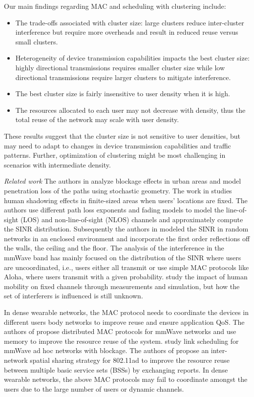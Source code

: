 \documentclass[10pt, conference, letterpaper]{IEEEtran}
\begin{document}
Our main findings regarding MAC and scheduling with clustering include:
\begin{itemize}
	\item The trade-offs associated with cluster size: large clusters reduce inter-cluster interference but require more overheads and result in reduced reuse versus small clusters.
	\item Heterogeneity of device transmission capabilities impacts the best cluster size: highly directional transmissions requires smaller cluster size while low directional transmissions require larger clusters to mitigate interference. 
	\item The best cluster size is fairly insensitive to user density when it is high. 
	\item The resources allocated to each user may not decrease with density, thus the total reuse of the network may scale with user density.
\end{itemize}

These results suggest that the cluster size is not sensitive to user densities, but may need to adapt to changes in device transmission capabilities and traffic patterns. 
Further, optimization of clustering might be most challenging in scenarios with intermediate density.

\emph{Related work}
The authors in \cite{urbanblockage} analyze blockage effects in urban areas and model penetration loss of the paths using stochastic geometry. 
The work in \cite{interferencefinitesized} studies human shadowing effects in finite-sized areas when users' locations are fixed. 
The authors use different path loss exponents and fading models to model the line-of-sight (LOS) and non-line-of-sight (NLOS) channels and approximately compute the SINR distribution. 
Subsequently the authors in \cite{enclosedmmwave} modeled the SINR in random networks in an enclosed environment and incorporate the first order reflections off the walls, the ceiling and the floor. 
The analysis of the interference in the mmWave band has mainly focused on the distribution of the SINR where users are uncoordinated, i.e., users either all transmit or use simple MAC protocols like Aloha, where users transmit with a given probability.
\cite{humanactivity}\cite{timevaryingpathshadowing}\cite{blockagein60ghz}study the impact of human mobility on fixed channels through measurements and simulation, but how the set of interferers is influenced is still unknown.

In dense wearable networks, the MAC protocol needs to coordinate the devices in different users body networks to improve reuse and ensure application QoS. 
The authors of \cite{dtdmac}\cite{mdmac} propose distributed MAC protocols for mmWave networks and use memory to improve the resource reuse of the system. 
\cite{onlinkscheduling} study link scheduling for mmWave ad hoc networks with blockage.
The authors of \cite{intersharing} propose an inter-network spatial sharing strategy for 802.11ad to improve the resource reuse between multiple basic service sets (BSSs) by exchanging reports.
In dense wearable networks, the above MAC protocols may fail to coordinate amongst the users due to the large number of users or dynamic channels. 
\end{document}
